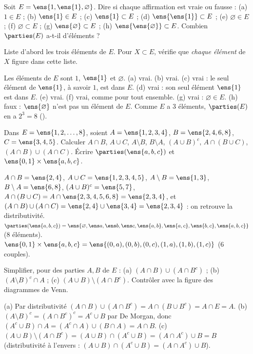 \begin{exo}
Soit $E=\ens{1,\ens{1},\varnothing}$. Dire si chaque affirmation est vraie ou fausse : (a) $1\in E$ ; (b) $\ens{1}\in E$ ; (c) $\ens{1}\subset E$ ; (d) $\ens{\ens{1}}\subset E$ ; (e) $\varnothing\in E$ ; (f) $\varnothing\subset E$ ; (g) $\ens{\varnothing}\subset E$ ; (h) $\ens{\ens{\varnothing}}\subset E$. Combien $\parties(E)$ a-t-il d'éléments ?
\begin{indication}
Liste d'abord les trois éléments de $E$. Pour $X\subset E$, vérifie que \emph{chaque élément} de $X$ figure dans cette liste.
\end{indication}
\begin{corrige}
Les éléments de $E$ sont $1$, $\ens{1}$ et $\varnothing$. (a) vrai. (b) vrai. (c) vrai : le seul élément de $\ens{1}$, à savoir $1$, est dans $E$. (d) vrai : son seul élément $\ens{1}$ est dans $E$. (e) vrai. (f) vrai, comme pour tout ensemble. (g) vrai : $\varnothing\in E$. (h) faux : $\ens{\varnothing}$ n'est pas un élément de $E$. Comme $E$ a $3$ éléments, $\parties(E)$ en a $2^3=8$ ().
\end{corrige}
\end{exo}
\begin{exo}
Dans $E=\ens{1,2,\dots,8}$, soient $A=\ens{1,2,3,4}$, $B=\ens{2,4,6,8}$, $C=\ens{3,4,5}$. Calculer $A\cap B$, $A\cup C$, $A\setminus B$, $B\setminus A$, $(A\cup B)^c$, $A\cap(B\cup C)$, $(A\cap B)\cup(A\cap C)$. Écrire $\parties(\ens{a,b,c})$ et $\ens{0,1}\times\ens{a,b,c}$.
\begin{corrige}
$A\cap B=\ens{2,4}$, $A\cup C=\ens{1,2,3,4,5}$, $A\setminus B=\ens{1,3}$, $B\setminus A=\ens{6,8}$, $(A\cup B)^c=\ens{5,7}$, $A\cap(B\cup C)=A\cap\ens{2,3,4,5,6,8}=\ens{2,3,4}$, et $(A\cap B)\cup(A\cap C)=\ens{2,4}\cup\ens{3,4}=\ens{2,3,4}$ : on retrouve la distributivité.
$\parties(\ens{a,b,c})=\ens{\varnothing,\ens a,\ens b,\ens c,\ens{a,b},\ens{a,c},\ens{b,c},\ens{a,b,c}}$ (8 éléments).
$\ens{0,1}\times\ens{a,b,c}=\ens{(0,a),(0,b),(0,c),(1,a),(1,b),(1,c)}$ (6 couples).
\end{corrige}
\end{exo}
\begin{exo}
Simplifier, pour des parties $A,B$ de $E$ : (a) $(A\cap B)\cup(A\cap B^c)$ ; (b) $(A\setminus B)^c\cap A$ ; (c) $(A\cup B)\setminus(A\cap B^c)$. Contrôler avec la figure des diagrammes de Venn.
\begin{corrige}
(a) Par distributivité $(A\cap B)\cup(A\cap B^c)=A\cap(B\cup B^c)=A\cap E=A$.
(b) $(A\setminus B)^c=(A\cap B^c)^c=A^c\cup B$ par De Morgan, donc $(A^c\cup B)\cap A=(A^c\cap A)\cup(B\cap A)=A\cap B$.
(c) $(A\cup B)\setminus(A\cap B^c)=(A\cup B)\cap(A^c\cup B)=(A\cap A^c)\cup B=B$ (distributivité \og à l'envers \fg : $(A\cup B)\cap(A^c\cup B)=(A\cap A^c)\cup B$).
\end{corrige}
\end{exo}
